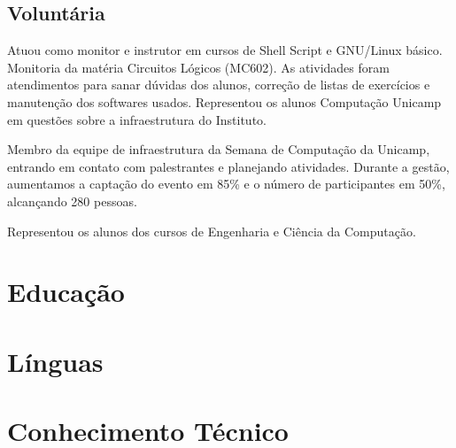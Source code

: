 \documentclass[10pt, a4paper, roman]{moderncv} %
\begin{document}
\subsection{Voluntária}
{
    Atuou como monitor e instrutor em cursos de Shell Script e GNU/Linux básico.
}
{
    Monitoria da matéria Circuitos Lógicos (MC602). As atividades foram atendimentos para sanar dúvidas 
    dos alunos, correção de listas de exercícios e manutenção dos softwares usados.
}
{
Representou os alunos Computação Unicamp em questões sobre a 
    infraestrutura do Instituto.
}

{
Membro da equipe de infraestrutura da Semana de Computação da Unicamp, entrando em contato com palestrantes e planejando atividades.
Durante a gestão, aumentamos a captação do evento em 85\% e o número de participantes em 50\%, alcançando 280 pessoas.
}

{
Representou os alunos dos cursos de Engenharia e Ciência da Computação.
}

\section{Educação}


\section{Línguas}

\section{Conhecimento Técnico}

\end{document}
